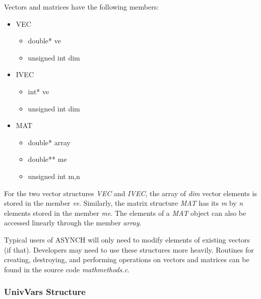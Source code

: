 \documentclass[12pt]{article}
\begin{document}
Vectors and matrices have the following members:
\begin{itemize}
 \item VEC
 \begin{itemize}
  \item double* ve
  \item unsigned int dim
 \end{itemize}
 \item IVEC
 \begin{itemize}
  \item int* ve
  \item unsigned int dim
 \end{itemize}
 \item MAT
 \begin{itemize}
  \item double* array
  \item double** me
  \item unsigned int m,n
 \end{itemize}
\end{itemize}
For the two vector structures \emph{VEC} and \emph{IVEC}, the array of \emph{dim} vector elements is stored in the member \emph{ve}. Similarly, the matrix structure \emph{MAT} has its \emph{m} by \emph{n} elements stored in the member \emph{me}. The elements of a \emph{MAT} object can also be accessed linearly through the member \emph{array}.

Typical users of ASYNCH will only need to modify elements of existing vectors (if that). Developers may need to use these structures more heavily. Routines for creating, destroying, and performing operations on vectors and matrices can be found in the source code \emph{mathmethods.c}.

\subsubsection{UnivVars Structure} \label{sec: univvars structure}
\end{document}
